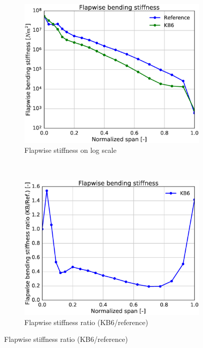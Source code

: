 %
\begin{figure}[tph]
\begin{subfigure}{0.50\textwidth}
\includegraphics[width=\linewidth]{figures/KB6_final/KB6_flapStiff_log.eps}
\caption{Flapwise stiffness on log scale}
\label{subfig:KB6_flapstiff_log}
\end{subfigure}
 ~
\begin{subfigure}{0.50\textwidth}
\includegraphics[width=\linewidth]{figures/KB6_final/KB6_flapStiff_ratio.eps}
\caption{Flapwise stiffness ratio (KB6/reference)}
\label{subfig:KB6_flapstiff_ratio}
\end{subfigure}


\end{figure}
